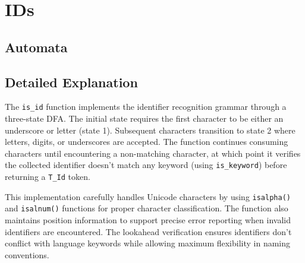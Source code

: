 \documentclass[12pt, a4paper]{report}
\begin{document}
\section{IDs}


\subsection{Automata}

\begin{center}
\end{center}

\subsection{Detailed Explanation}
The \texttt{is\_id} function implements the identifier recognition grammar through a three-state DFA. The initial state requires the first character to be either an underscore or letter (state 1). Subsequent characters transition to state 2 where letters, digits, or underscores are accepted. The function continues consuming characters until encountering a non-matching character, at which point it verifies the collected identifier doesn't match any keyword (using \texttt{is\_keyword}) before returning a \texttt{T\_Id} token.

This implementation carefully handles Unicode characters by using \texttt{isalpha()} and \texttt{isalnum()} functions for proper character classification. The function also maintains position information to support precise error reporting when invalid identifiers are encountered. The lookahead verification ensures identifiers don't conflict with language keywords while allowing maximum flexibility in naming conventions.
\end{document}
